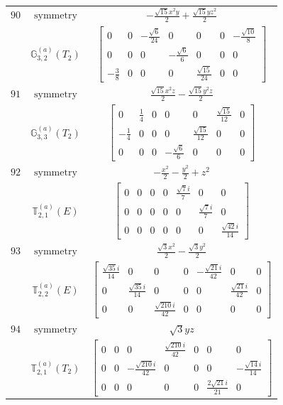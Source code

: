 \documentclass[fleqn,8pt,landscape]{jsarticle}
\begin{document}
\begin{longtable}{ccc}
$ 90 $ & $ \text{symmetry} $ & $ - \frac{\sqrt{15} x^{2} y}{2} + \frac{\sqrt{15} y z^{2}}{2} $ \\
$  $ & $ \mathbb{G}_{3,2}^{(a)}(T_{2}) $ & $ \begin{bmatrix} 0 & 0 & - \frac{\sqrt{6}}{24} & 0 & 0 & 0 & - \frac{\sqrt{10}}{8} \\ 0 & 0 & 0 & - \frac{\sqrt{6}}{6} & 0 & 0 & 0 \\ - \frac{3}{8} & 0 & 0 & 0 & \frac{\sqrt{15}}{24} & 0 & 0 \end{bmatrix} $ \\ \hline
$ 91 $ & $ \text{symmetry} $ & $ \frac{\sqrt{15} x^{2} z}{2} - \frac{\sqrt{15} y^{2} z}{2} $ \\
$  $ & $ \mathbb{G}_{3,3}^{(a)}(T_{2}) $ & $ \begin{bmatrix} 0 & \frac{1}{4} & 0 & 0 & 0 & \frac{\sqrt{15}}{12} & 0 \\ - \frac{1}{4} & 0 & 0 & 0 & \frac{\sqrt{15}}{12} & 0 & 0 \\ 0 & 0 & 0 & - \frac{\sqrt{6}}{6} & 0 & 0 & 0 \end{bmatrix} $ \\ \hline
$ 92 $ & $ \text{symmetry} $ & $ - \frac{x^{2}}{2} - \frac{y^{2}}{2} + z^{2} $ \\
$  $ & $ \mathbb{T}_{2,1}^{(a)}(E) $ & $ \begin{bmatrix} 0 & 0 & 0 & 0 & \frac{\sqrt{7} i}{7} & 0 & 0 \\ 0 & 0 & 0 & 0 & 0 & \frac{\sqrt{7} i}{7} & 0 \\ 0 & 0 & 0 & 0 & 0 & 0 & \frac{\sqrt{42} i}{14} \end{bmatrix} $ \\ \hline
$ 93 $ & $ \text{symmetry} $ & $ \frac{\sqrt{3} x^{2}}{2} - \frac{\sqrt{3} y^{2}}{2} $ \\
$  $ & $ \mathbb{T}_{2,2}^{(a)}(E) $ & $ \begin{bmatrix} \frac{\sqrt{35} i}{14} & 0 & 0 & 0 & - \frac{\sqrt{21} i}{42} & 0 & 0 \\ 0 & \frac{\sqrt{35} i}{14} & 0 & 0 & 0 & \frac{\sqrt{21} i}{42} & 0 \\ 0 & 0 & \frac{\sqrt{210} i}{42} & 0 & 0 & 0 & 0 \end{bmatrix} $ \\ \hline
$ 94 $ & $ \text{symmetry} $ & $ \sqrt{3} y z $ \\
$  $ & $ \mathbb{T}_{2,1}^{(a)}(T_{2}) $ & $ \begin{bmatrix} 0 & 0 & 0 & \frac{\sqrt{210} i}{42} & 0 & 0 & 0 \\ 0 & 0 & - \frac{\sqrt{210} i}{42} & 0 & 0 & 0 & - \frac{\sqrt{14} i}{14} \\ 0 & 0 & 0 & 0 & 0 & \frac{2 \sqrt{21} i}{21} & 0 \end{bmatrix} $ \\ \hline

\end{longtable}
\end{document}

